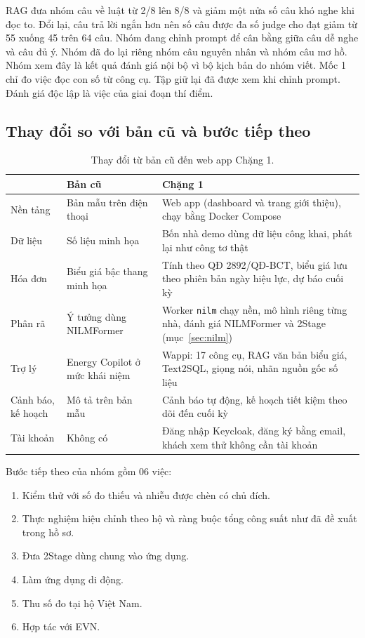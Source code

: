 RAG đưa nhóm câu về luật từ 2/8 lên 8/8 và giảm một nửa số câu khó nghe khi đọc to. Đổi lại, câu trả lời ngắn hơn nên số câu được đa số judge cho đạt giảm từ 55 xuống 45 trên 64 câu. Nhóm đang chỉnh prompt để cân bằng giữa câu dễ nghe và câu đủ ý. Nhóm đã đo lại riêng nhóm câu nguyên nhân và nhóm câu mơ hồ. Nhóm xem đây là kết quả đánh giá nội bộ vì bộ kịch bản do nhóm viết. Mốc 1 chỉ đo việc đọc con số từ công cụ. Tập giữ lại đã được xem khi chỉnh prompt. Đánh giá độc lập là việc của giai đoạn thí điểm.

\subsection{Thay đổi so với bản cũ và bước tiếp theo}

\begin{table}[!ht]
\centering\caption{Thay đổi từ bản cũ đến web app Chặng 1.}\label{tab:changes}
\small\setlength{\tabcolsep}{4pt}\renewcommand{\arraystretch}{1.15}
\begin{tabularx}{\linewidth}{|>{\raggedright\arraybackslash}p{2.5cm}|>{\raggedright\arraybackslash}X|>{\raggedright\arraybackslash}X|}
\hline
 & \textbf{Bản cũ} & \textbf{Chặng 1}\\
\hline
Nền tảng & Bản mẫu trên điện thoại & Web app (dashboard và trang giới thiệu), chạy bằng Docker Compose\\
\hline
Dữ liệu & Số liệu minh họa & Bốn nhà demo dùng dữ liệu công khai, phát lại như công tơ thật\\
\hline
Hóa đơn & Biểu giá bậc thang minh họa & Tính theo QĐ 2892/QĐ-BCT, biểu giá lưu theo phiên bản ngày hiệu lực, dự báo cuối kỳ\\
\hline
Phân rã & Ý tưởng dùng NILMFormer & Worker \texttt{nilm} chạy nền, mô hình riêng từng nhà, đánh giá NILMFormer và 2Stage (mục~\ref{sec:nilm})\\
\hline
Trợ lý & Energy Copilot ở mức khái niệm & Wappi: 17 công cụ, RAG văn bản biểu giá, Text2SQL, giọng nói, nhãn nguồn gốc số liệu\\
\hline
Cảnh báo, kế hoạch & Mô tả trên bản mẫu & Cảnh báo tự động, kế hoạch tiết kiệm theo dõi đến cuối kỳ\\
\hline
Tài khoản & Không có & Đăng nhập Keycloak, đăng ký bằng email, khách xem thử không cần tài khoản\\
\hline
\end{tabularx}
\end{table}

Bước tiếp theo của nhóm gồm 06 việc:
\begin{enumerate}
\item Kiểm thử với số đo thiếu và nhiễu được chèn có chủ đích.
\item Thực nghiệm hiệu chỉnh theo hộ và ràng buộc tổng công suất như đã đề xuất trong hồ sơ.
\item Đưa 2Stage dùng chung vào ứng dụng.
\item Làm ứng dụng di động.
\item Thu số đo tại hộ Việt Nam.
\item Hợp tác với EVN.
\end{enumerate}
